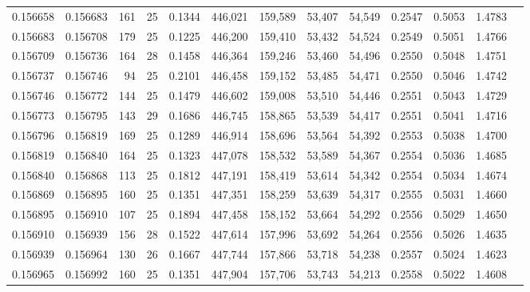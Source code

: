 \begin{tabular}{rrrrrrrrrrrrr}
0.156658 & 0.156683 & 161 &  25 &                                     0.1344 & 446,021 & 159,589 &  53,407 &  54,549 & 0.2547 & 0.5053 & 1.4783 \\
0.156683 & 0.156708 & 179 &  25 &                                     0.1225 & 446,200 & 159,410 &  53,432 &  54,524 & 0.2549 & 0.5051 & 1.4766 \\
0.156709 & 0.156736 & 164 &  28 &                                     0.1458 & 446,364 & 159,246 &  53,460 &  54,496 & 0.2550 & 0.5048 & 1.4751 \\
0.156737 & 0.156746 &  94 &  25 &                                     0.2101 & 446,458 & 159,152 &  53,485 &  54,471 & 0.2550 & 0.5046 & 1.4742 \\
0.156746 & 0.156772 & 144 &  25 &                                     0.1479 & 446,602 & 159,008 &  53,510 &  54,446 & 0.2551 & 0.5043 & 1.4729 \\
0.156773 & 0.156795 & 143 &  29 &                                     0.1686 & 446,745 & 158,865 &  53,539 &  54,417 & 0.2551 & 0.5041 & 1.4716 \\
0.156796 & 0.156819 & 169 &  25 &                                     0.1289 & 446,914 & 158,696 &  53,564 &  54,392 & 0.2553 & 0.5038 & 1.4700 \\
0.156819 & 0.156840 & 164 &  25 &                                     0.1323 & 447,078 & 158,532 &  53,589 &  54,367 & 0.2554 & 0.5036 & 1.4685 \\
0.156840 & 0.156868 & 113 &  25 &                                     0.1812 & 447,191 & 158,419 &  53,614 &  54,342 & 0.2554 & 0.5034 & 1.4674 \\
0.156869 & 0.156895 & 160 &  25 &                                     0.1351 & 447,351 & 158,259 &  53,639 &  54,317 & 0.2555 & 0.5031 & 1.4660 \\
0.156895 & 0.156910 & 107 &  25 &                                     0.1894 & 447,458 & 158,152 &  53,664 &  54,292 & 0.2556 & 0.5029 & 1.4650 \\
0.156910 & 0.156939 & 156 &  28 &                                     0.1522 & 447,614 & 157,996 &  53,692 &  54,264 & 0.2556 & 0.5026 & 1.4635 \\
0.156939 & 0.156964 & 130 &  26 &                                     0.1667 & 447,744 & 157,866 &  53,718 &  54,238 & 0.2557 & 0.5024 & 1.4623 \\
0.156965 & 0.156992 & 160 &  25 &                                     0.1351 & 447,904 & 157,706 &  53,743 &  54,213 & 0.2558 & 0.5022 & 1.4608 \\

\end{tabular}

